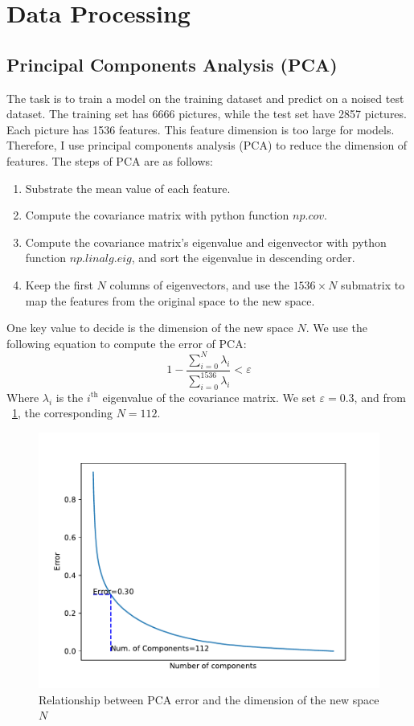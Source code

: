 \section{Data Processing}
\label{sec:data-processing}

\subsection{Principal Components Analysis (PCA)}
\label{sec:data-processing:pca}

The task is to train a model on the training dataset and predict on a noised test dataset.
The training set has 6666 pictures, while the test set have 2857 pictures.
Each picture has 1536 features.
This feature dimension is too large for models.
Therefore, I use principal components analysis (PCA) to reduce the dimension of features.
The steps of PCA are as follows:
\begin{enumerate}
    \item Substrate the mean value of each feature.
    \item Compute the covariance matrix with python function $np.cov$.
    \item Compute the covariance matrix's eigenvalue and eigenvector with python function $np.linalg.eig$, and sort the eigenvalue in descending order.
    \item Keep the first $N$ columns of eigenvectors, and use the $1536\times N$ submatrix to map the features from the original space to the new space.
\end{enumerate}

One key value to decide is the dimension of the new space $N$.
We use the following equation to compute the error of PCA:
\begin{equation}
    1 - \dfrac{\sum_{i=0}^N \lambda_i}{\sum_{i=0}^{1536} \lambda_i} < \varepsilon
    \label{eqn:pca-error}
\end{equation}
Where $\lambda_i$ is the $i^\mathrm{th}$ eigenvalue of the covariance matrix.
We set $\varepsilon=0.3$, and from \figurename{}~\ref{fig:pca}, the corresponding $N=112$.

\begin{figure}
    \centering
    \includegraphics[width=0.9\linewidth]{figures/pca_components.pdf}
    \caption{Relationship between PCA error and the dimension of the new space $N$}
    \label{fig:pca}
\end{figure}


